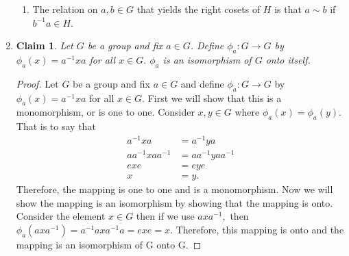\documentclass{article}
\newtheorem{ishaan}{Claim}[section]
\begin{document}
\begin{enumerate}
\begin{enumerate}
        \item
        
        The relation on $a,b\in G$ that yields the right cosets of $H$ is that $a\sim b$ if $b^{-1}a\in H$.
        
    \end{enumerate}
    \pagebreak 
    
    \item
    
    \begin{ishaan}
    Let $G$ be a group and fix $a\in G$. Define $\phi_a: G\rightarrow G$ by $\phi_a(x)=a^{-1}xa$ for all $x\in G.$ $\phi_a$ is an isomorphism of $G$ onto itself.
    \end{ishaan}
    \begin{proof}
    Let $G$ be a group and fix $a\in G$ and define $\phi_a: G\rightarrow G$ by $\phi_a(x)=a^{-1}xa$ for all $x\in G$. First we will show that this is a monomorphism, or is one to one. Consider $x, y\in G$ where $\phi_a(x)=\phi_a(y).$ That is to say that 
    \begin{align*}
        a^{-1}xa &= a^{-1}ya\\
        aa^{-1}xaa^{-1} &= aa^{-1}yaa^{-1}\\
        exe &= eye\\
        x &= y.
    \end{align*} Therefore, the mapping is one to one and is a monomorphism. Now we will show the mapping is an isomorphism by showing that the mapping is onto. Consider the element $x\in G$ then if we use $axa^{-1},$ then $\phi_a(axa^{-1})=a^{-1}axa^{-1}a = exe = x.$ Therefore, this mapping is onto and the mapping is an isomorphism of G onto G.
    \end{proof}
    
\end{enumerate}
\end{document}
